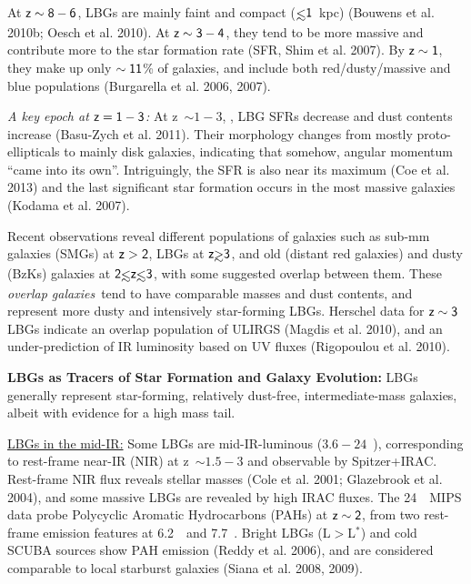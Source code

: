 \documentclass[12pt]{article}
\begin{document}
\hspace{0.1in}
At $\sf z\sim 8-6$, LBGs are mainly faint and compact ($\sf \lsim
1$~kpc) (Bouwens et al. 2010b; Oesch et al. 2010).
At $\sf z\sim 3-4$, they tend to be more massive and contribute
more to the star formation rate (SFR, Shim et al. 2007).  By
$\sf z\sim 1$, they make up only $\sf \sim 11$\% of galaxies, and include both
red/dusty/massive and blue populations (Burgarella et al. 2006,
2007).

\hspace{0.1in}
{\it A key epoch at $\sf z=1-3$:}
At z~$\sim 1-3$, , LBG SFRs decrease and dust
contents increase (Basu-Zych et al. 2011). Their morphology changes
from mostly proto-ellipticals to mainly disk galaxies, indicating that
somehow, angular momentum ``came into its own''.
Intriguingly, the SFR is also near its maximum
(Coe et al. 2013) and the
last significant star formation occurs in the most massive galaxies
(Kodama et al. 2007). 

\hspace{0.1in}
Recent observations reveal different populations of
galaxies such as sub-mm galaxies (SMGs) at $\sf z>2$, LBGs at
$\sf z\gsim3$, and old (distant red galaxies) and dusty (BzKs)
galaxies at $\sf 2\lsim z\lsim 3$, with some suggested overlap between them.
These {\it overlap galaxies}\, tend to have comparable masses and
dust contents, and represent more dusty and intensively star-forming
LBGs. Herschel data for $\sf z\sim 3$ LBGs indicate an overlap
population of ULIRGS  (Magdis et al. 2010), and an under-prediction of
IR luminosity based on UV fluxes (Rigopoulou et al. 2010). 

\hspace{0.1in}
{\bf LBGs as Tracers of Star Formation and Galaxy Evolution:}
LBGs generally represent 
star-forming, relatively dust-free, intermediate-mass
galaxies, albeit with evidence
for a high mass tail.

\hspace{0.1in}
\underline{LBGs in the mid-IR:} Some LBGs are
mid-IR-luminous  ($3.6-24$~\mum), corresponding to rest-frame near-IR (NIR)
at z~$\sim 1.5-3$ and observable by Spitzer+IRAC. 
Rest-frame NIR flux reveals stellar masses
(Cole et al. 2001; Glazebrook et
al. 2004), and some massive LBGs are revealed by high IRAC fluxes.
The 24~\mum\ MIPS data probe Polycyclic Aromatic
Hydrocarbons (PAHs) at $\sf z\sim 2$, from two rest-frame emission
features at 6.2~\mum\ and 7.7~\mum. 
Bright LBGs (L$>$L$^*$) and cold SCUBA sources show PAH emission 
(Reddy et al. 2006), and are considered
comparable to local starburst galaxies
(Siana et al. 2008, 2009).
\end{document}

